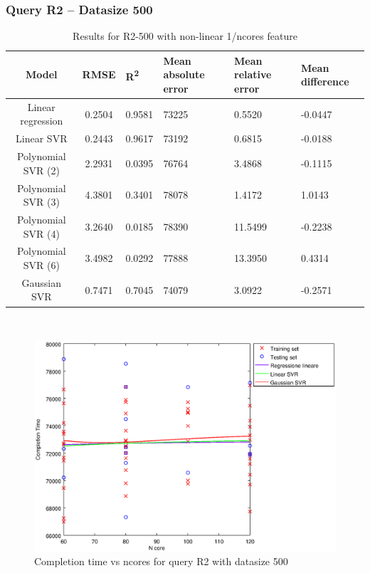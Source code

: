 \documentclass[a4paper,11pt]{article}
\begin{document}
\newpage
\subsubsection{Query R2 -- Datasize 500}
\begin{table}[H]
	\centering
	\begin{adjustbox}{center}
		\begin{tabular}{c | c M{1.2cm} M{2.5cm} M{2.5cm} M{1.8cm}}
			Model & RMSE & R\textsuperscript{2} & Mean absolute error & Mean relative error & Mean difference \tabularnewline
			\hline
			Linear regression & 0.2504 & 0.9581 &  73225 & 0.5520 & -0.0447 \\
			Linear SVR & 0.2443 & 0.9617 &  73192 & 0.6815 & -0.0188 \\
			Polynomial SVR (2) & 2.2931 & 0.0395 &  76764 & 3.4868 & -0.1115 \\
			Polynomial SVR (3) & 4.3801 & 0.3401 &  78078 & 1.4172 & 1.0143 \\
			Polynomial SVR (4) & 3.2640 & 0.0185 &  78390 & 11.5499 & -0.2238 \\
			Polynomial SVR (6) & 3.4982 & 0.0292 &  77888 & 13.3950 & 0.4314 \\
			Gaussian SVR & 0.7471 & 0.7045 &  74079 & 3.0922 & -0.2571 \\
		\end{tabular}
	\end{adjustbox}
	\\
	\caption{Results for R2-500 with non-linear 1/ncores feature}
	\label{table_R2_prediction_all}
\end{table}

\begin {figure}[hbtp]
\centering
\includegraphics[width=\textwidth]{output/R2_500_1_OVER_NCORES/plot_R2_500_bestmodels.eps}
\caption {Completion time vs ncores for query R2 with datasize 500}
\end {figure}
\end{document}
